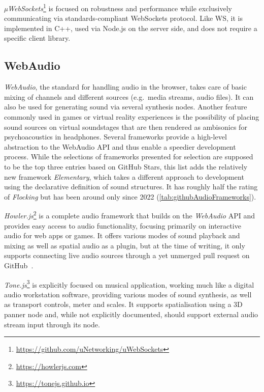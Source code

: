 \emph{µWebSockets}\footnote{\url{https://github.com/uNetworking/uWebSockets}} is focused on robustness and performance while exclusively communicating via standards-compliant WebSockets protocol.
Like WS, it is implemented in C++, used via Node.js on the server side, and does not require a specific client library.

\subsection{WebAudio}

\emph{WebAudio}, the standard for handling audio in the browser, takes care of basic mixing of channels and different sources (e.g.\ media streams, audio files).
It can also be used for generating sound via several synthesis nodes.
Another feature commonly used in games or virtual reality experiences is the possibility of placing sound sources on virtual soundstages that are then rendered as ambisonics for psychoacoustics in headphones.
Several frameworks provide a high-level abstraction to the WebAudio \ac{API} and thus enable a speedier development process.
While the selections of frameworks presented for selection are supposed to be the top three entries based on GitHub Stars, this list adds the relatively new framework \emph{Elementary}, which takes a different approach to development using the declarative definition of sound structures.
It has roughly half the rating of \emph{Flocking} but has been around only since 2022 (\ref{tab:githubAudioFrameworks}).



\emph{Howler.js}\footnote{\url{https://howlerjs.com}} is a complete audio framework that builds on the \emph{WebAudio} \ac{API} and provides easy access to audio functionality, focusing primarily on interactive audio for web apps or games.
It offers various modes of sound playback and mixing as well as spatial audio as a plugin, but at the time of writing, it only supports connecting live audio sources through a yet unmerged pull request on GitHub~\parencite{githubHowlerPullRequest}.

\emph{Tone.js}\footnote{\url{https://tonejs.github.io}} is explicitly focused on musical application, working much like a digital audio workstation software, providing various modes of sound synthesis, as well as transport controls, meter and scales.
It supports spatialisation using a \ac{3D} panner node and, while not explicitly documented, should support external audio stream input through its  node.

